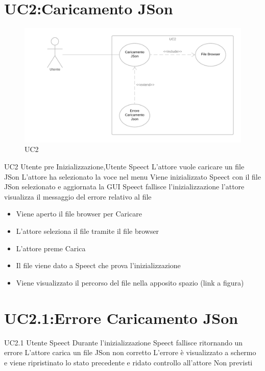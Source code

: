 \documentclass[../AnalisideiRequisiti.tex]{subfiles}
\begin{document}
	\section{UC2:Caricamento JSon}
	\begin{figure}[htp]
		\caption{UC2}
		\centering
		\includegraphics[width=\textwidth]{../img/UC02.png}
	\end{figure}
	\UserCase
	{UC2}
	{Utente pre Inizializzazione,Utente}
	{Speect}
	{L'attore vuole caricare un file JSon}
	{L'attore ha selezionato la voce nel menu}
	{Viene inizializzato Speect con il file JSon selezionato e aggiornata la GUI}
	{Speect fallisce l'inizializzazione l'attore visualizza il messaggio del errore relativo al file }
	{
		\begin{itemize}
			\item{} Viene aperto il file browser per Caricare
			\item{} L'attore seleziona il file tramite il file browser 
			\item{} L'attore preme Carica
			\item{} Il file viene dato a Speect che prova l'inizializzazione
			\item{} Viene visualizzato il percorso del file nella apposito spazio (link a figura)
		\end{itemize}
	}
	\section{UC2.1:Errore Caricamento JSon}
	\UserCase
	{UC2.1}
	{Utente}
	{Speect}
	{Durante l'inizializzazione Speect fallisce ritornando un errore }
	{L'attore carica un file JSon non corretto}
	{L'errore è visualizzato a schermo e viene ripristinato lo stato precedente e ridato controllo all'attore}
	{Non previsti}
	{}

	
\end{document}
